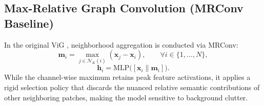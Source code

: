 \documentclass[]{interact}
\theoremstyle{plain}
\theoremstyle{definition}
\theoremstyle{remark}
\begin{document}
\subsection{Max-Relative Graph Convolution (MRConv Baseline)}
{\color{blue}
\label{sec:mrconv_baseline}

In the original ViG \citep{han2022vision}, neighborhood aggregation is conducted via MRConv:
\begin{equation}
\mathbf{m}_i = \max_{j \in \mathcal{N}_K(i)} (\mathbf{x}_j - \mathbf{x}_i), \qquad \forall i \in \{1, \dots, N\},
\end{equation}
\begin{equation}
\mathbf{h}_i = \text{MLP}\big([\mathbf{x}_i \parallel \mathbf{m}_i]\big).
\end{equation}
While the channel-wise maximum retains peak feature activations, it applies a rigid selection policy that discards the nuanced relative semantic contributions of other neighboring patches, making the model sensitive to background clutter.

}
\end{document}
